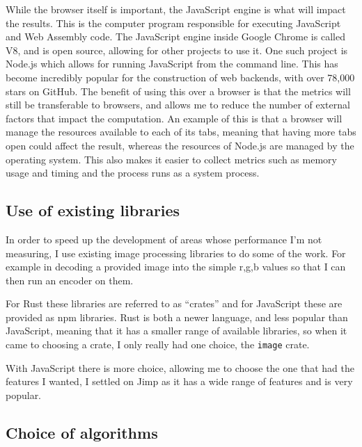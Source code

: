 \documentclass[12pt,a4paper]{article}
\begin{document}
While the browser itself is important, the JavaScript engine is what will impact the results. This is the computer program responsible for executing JavaScript and Web Assembly code. The JavaScript engine inside Google Chrome is called V8, and is open source, allowing for other projects to use it. One such project is Node.js which allows for running JavaScript from the command line. This has become incredibly popular for the construction of web backends, with over 78,000 stars on GitHub. The benefit of using this over a browser is that the metrics will still be transferable to browsers, and allows me to reduce the number of external factors that impact the computation. An example of this is that a browser will manage the resources available to each of its tabs, meaning that having more tabs open could affect the result, whereas the resources of Node.js are managed by the operating system. This also makes it easier to collect metrics such as memory usage and timing and the process runs as a system process.

\subsection{Use of existing libraries}

In order to speed up the development of areas whose performance I'm not measuring, I use existing image processing libraries to do some of the work. For example in decoding a provided image into the simple r,g,b values so that I can then run an encoder on them.

For Rust these libraries are referred to as “crates” and for JavaScript these are provided as npm libraries. Rust is both a newer language, and less popular than JavaScript, meaning that it has a smaller range of available libraries, so when it came to choosing a crate, I only really had one choice, the \texttt{image} crate.

With JavaScript there is more choice, allowing me to choose the one that had the features I wanted, I settled on Jimp as it has a wide range of features and is very popular.



\subsection{Choice of algorithms}
\end{document}
